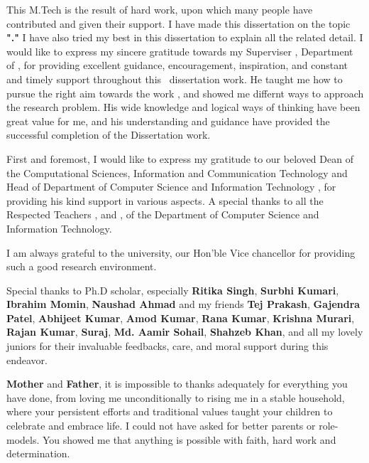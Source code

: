 
\begin{acknowledgements}
\addchaptertocentry{\acknowledgementname} %
\vspace*{2cm}
This M.Tech \rType is the result of hard work, upon which many people have contributed and given their support. I
have made this dissertation on the topic \textbf{"\ReportTitel ."} I have also tried my best in this dissertation to
explain all the related detail. I would like to express my sincere gratitude towards my Superviser \textbf{
	\Supervisor}, Department of \depS, for providing excellent guidance, encouragement, inspiration, and constant and
timely support throughout this \DegreeS \  dissertation work. He taught me how to pursue the right aim towards the work
, and showed me differnt ways to approach the research problem. His wide knowledge and logical ways of thinking have
been great value for me, and his understanding and guidance have provided the successful completion of the
Dissertation work.

First and foremost, I would like to express my gratitude to our beloved Dean of the Computational Sciences,
Information and Communication Technology and Head of Department of Computer Science and Information Technology \textbf{\HodName},
for providing his kind support in various aspects. A special thanks to all the Respected Teachers
\textbf{\Facone}, and \textbf{\Factwo}, of the Department of Computer Science and Information
Technology.

I am always grateful to the university, our Hon’ble Vice chancellor \textbf{\Vc} for providing
such a good research environment.

	Special thanks to Ph.D scholar, especially \textbf{Ritika Singh}, \textbf{Surbhi Kumari}, \textbf{Ibrahim Momin},
\textbf{Naushad Ahmad} and  my friends \textbf{Tej Prakash}, \textbf{Gajendra Patel}, \textbf{Abhijeet Kumar},
\textbf{Amod Kumar}, \textbf{Rana Kumar}, \textbf{Krishna Murari}, \textbf{Rajan Kumar}, \textbf{Suraj}, \textbf{Md.
Aamir Sohail}, \textbf{
	Shahzeb Khan},
and all my lovely juniors  for their invaluable feedbacks, care, and moral support during this endeavor.

	\textbf{Mother} and \textbf{Father}, it is impossible to thanks adequately for everything you have done, from
loving me unconditionally to rising me in a stable household, where your persistent efforts and traditional values
taught your children to celebrate and embrace life. I could not have asked for better parents or role-models. You
showed me that anything is possible with faith, hard work and determination. 



\end{acknowledgements}
